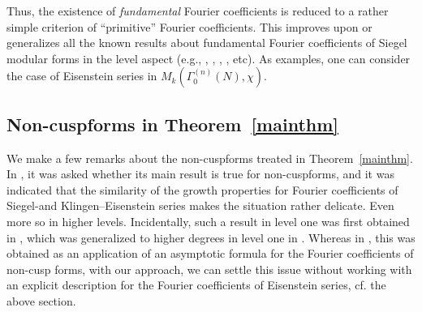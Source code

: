 \documentclass[11pt]{amsart}
\numberwithin{equation}{section}
\begin{document}
Thus, the existence of \textit{fundamental} Fourier coefficients is reduced to a rather simple criterion of ``primitive'' Fourier coefficients. This improves upon or generalizes all the known results about fundamental Fourier coefficients of Siegel modular forms in the level aspect (e.g., \cite{saha2013yoshida}, \cite{boche-das}, \cite{anamby2024non}, \cite{washburn2025certain}, etc).
As examples, one can consider the case of Eisenstein series in $ M_k(\Gamma_{0}^{(n)}(N), \chi)$. 

\subsection{Non-cuspforms in Theorem~\ref{mainthm}}

We make a few remarks about the non-cuspforms treated in Theorem~\ref{mainthm}. In \cite[Remark~2.6]{saha2013siegel},  it was asked whether its main result is true for non-cuspforms, and it was indicated that the similarity of the growth properties for Fourier coefficients of Siegel-and Klingen–Eisenstein series makes the situation rather delicate. Even more so in higher levels.
Incidentally, such a result in level one was first obtained in \cite[Proposition~7.7]{das-boech-FJ2018}, which was generalized to higher degrees in level one in \cite{boche-das}. Whereas in \cite{das-boech-FJ2018}, this was obtained as an application of an asymptotic formula for the Fourier coefficients of non-cusp forms, with our approach, we can settle this issue without working with an explicit description for the Fourier coefficients of Eisenstein series, cf. the above section. 

\end{document}
